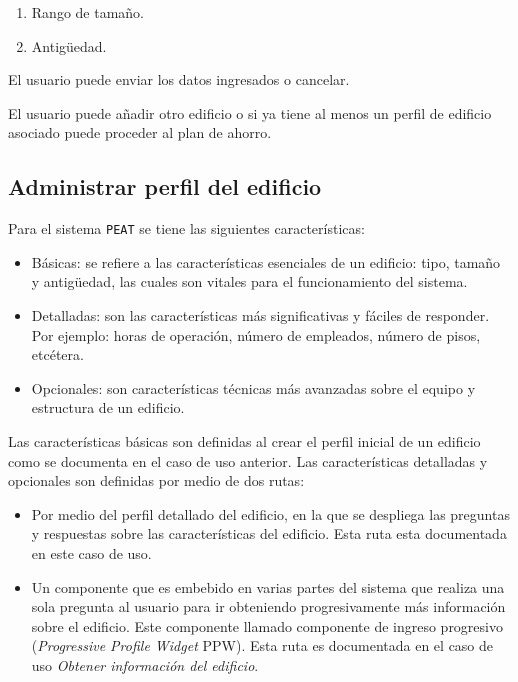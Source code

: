 \begin{usecase}
{\begin{enumerate}
    \item Rango de tamaño.
    \item Antigüedad.
    \end{enumerate}
  \item El usuario puede enviar los datos ingresados o cancelar.
  \item El usuario puede añadir otro edificio o si ya tiene al menos un
    perfil de edificio asociado puede proceder al plan de ahorro.
  }
\end{usecase}

\subsection{Administrar perfil del edificio}

Para el sistema \texttt{PEAT} se tiene las siguientes características:
\begin{itemize}
\item Básicas: se refiere a las características esenciales de un edificio: tipo,
  tamaño y antigüedad, las cuales son vitales para el funcionamiento del sistema.
\item Detalladas: son las características más significativas y fáciles de
  responder. Por ejemplo: horas de operación, número de empleados, número
  de pisos, etcétera.
\item Opcionales: son características técnicas más avanzadas sobre el equipo
  y estructura de un edificio.
\end{itemize}

Las características básicas son definidas al crear el perfil inicial de un
edificio como se documenta en el caso de uso anterior. Las características
detalladas y opcionales son definidas por medio de dos rutas:

\begin{itemize}
\item Por medio del perfil detallado del edificio, en la que se despliega
  las preguntas y respuestas sobre las características del edificio.
  Esta ruta esta documentada en este caso de uso.
\item Un componente que es embebido en varias partes del sistema
  que realiza una sola pregunta al usuario para ir obteniendo progresivamente
  más información sobre el edificio. Este componente llamado componente
  de ingreso progresivo (\textit{Progressive Profile Widget} PPW).
  Esta ruta es documentada en el caso de uso \textit{Obtener información
    del edificio}.
\end{itemize}

